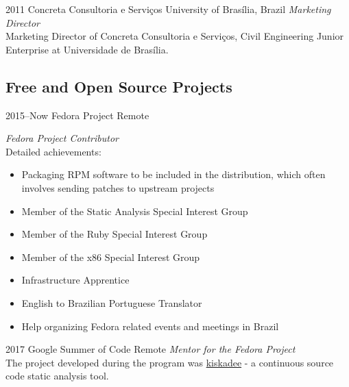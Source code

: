 \documentclass[print]{friggeri-cv}
\begin{document}
\begin{entrylist}


\entry
{2011}
{Concreta Consultoria e Serviços}
{University of Brasília, Brazil}
{\emph{Marketing Director} \\
Marketing Director of Concreta Consultoria e Serviços, Civil Engineering Junior
  Enterprise at Universidade de Brasília. \\
}


\end{entrylist}

\subsection{Free and Open Source Projects}

\begin{entrylist}

\entry
{2015--Now}
{Fedora Project}
{Remote}
{\emph{Fedora Project Contributor} \\
Detailed achievements:
  \begin{itemize}
    \item Packaging RPM software to be included in the distribution, which often involves sending patches to upstream projects
    \item Member of the Static Analysis Special Interest Group
    \item Member of the Ruby Special Interest Group
    \item Member of the x86 Special Interest Group
    \item Infrastructure Apprentice
    \item English to Brazilian Portuguese Translator
    \item Help organizing Fedora related events and meetings in Brazil
  \end{itemize}}


\entry
{2017}
{Google Summer of Code}
{Remote}
{\emph{Mentor for the Fedora Project} \\
  The project developed during the program was
  \href{pagure.io/kiskadee}{kiskadee} - a continuous source code static
  analysis tool. \\
 }


\end{entrylist}
\end{document}
